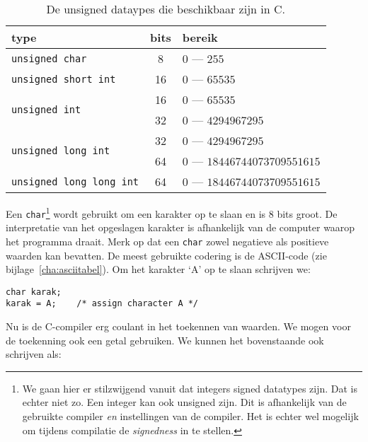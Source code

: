 \begin{table}[!ht]
\centering
\caption{De unsigned dataypes die beschikbaar zijn in C.}
\label{tab:varintdatatypesunsiged}
\begin{tabular}{@{}lcl@{}}
\toprule
\textbf{type}                               & \textbf{bits} & \textbf{bereik}  \\ \midrule
\texttt{unsigned char}                      & 8             & $0$ --- $255$  \\
\texttt{unsigned short int}                 & 16            & $0$ --- $65535$ \\
\multirow{2}{*}{\texttt{unsigned int}}      & 16            & $0$ --- $65535$ \\
                                            & 32            & $0$ --- $4294967295$ \\
\multirow{2}{*}{\texttt{unsigned long int}} & 32            & $0$ --- $4294967295$ \\
                                            & 64            & $0$ --- $18446744073709551615$  \\
\texttt{unsigned long long int}             & 64            & $0$ --- $18446744073709551615$  \\
   \bottomrule
\end{tabular}
\end{table}

Een \texttt{char}\footnote{We gaan hier er stilzwijgend vanuit dat integers signed datatypes zijn. Dat is echter niet zo. Een integer kan ook unsigned zijn. Dit is afhankelijk van de gebruikte compiler \textsl{en} instellingen van de compiler. Het is echter wel mogelijk om tijdens compilatie de \textsl{signedness} in te stellen.} wordt gebruikt om een karakter op te slaan en is 8 bits groot. De interpretatie van het opgeslagen karakter is afhankelijk van de computer waarop het programma draait. Merk op dat een \texttt{char} zowel negatieve als positieve waarden kan bevatten. De meest gebruikte codering is de ASCII-code (zie bijlage~\ref{cha:asciitabel}). Om het karakter `A' op te slaan schrijven we:

\hspace*{1em}\texttt{char karak;}\\
\hspace*{1em}\texttt{karak = \textquotesingle A\textquotesingle; \ \ \ /* assign character A */}

Nu is de C-compiler erg coulant in het toekennen van waarden. We mogen voor de toekenning ook een getal gebruiken. We kunnen het bovenstaande ook schrijven als:

